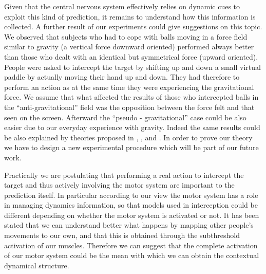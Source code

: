 Given that the central nervous system effectively relies on dynamic cues to exploit this kind of prediction, it remains to understand how this information is collected. A further result of our experiments could give suggestions on this topic.
We observed that subjects who had to cope with balls moving in a force field similar to gravity (a vertical force downward oriented) performed always better than those who dealt with an identical but symmetrical force (upward oriented). People were asked to intercept the target by shifting up and down a small virtual paddle by actually moving their hand up and down. They had therefore to perform an action as at the same time they were experiencing the gravitational force. We assume that what affected the results of those who intercepted balls in the ``anti-gravitational'' field was the opposition between the force felt and that seen on the screen.  Afterward the ``pseudo - gravitational'' case could be also easier due to our everyday experience with gravity. Indeed the same results could be also explained by theories proposed in \citep{McIntyre}, \citep{Lacquaniti}, \citep{Lacquaniti_internal} and \citep{McIntyre2}. In order to prove our theory we have to design a new experimental procedure which will be part of our future work.

Practically we are postulating that performing a real action to intercept the target and thus actively involving the motor system are important to the prediction itself. In particular according to our view the motor system has a role in managing dynamics information, so that models used in interception could be different depending on whether the motor system is activated or not.
It has been stated that we can understand better what happens by mapping other people's movements to our own, and that this is obtained through the subthreshold activation of our muscles. Therefore we can suggest that the complete activation of our motor system could be the mean with which we can obtain the contextual dynamical structure.
% 

